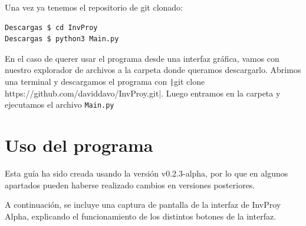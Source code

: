 \documentclass[a4paper, 11pt]{report} %
\begin{document}
\noindent Una vez ya tenemos el repositorio de git clonado:
\begin{verbatim}
Descargas $ cd InvProy
Descargas $ python3 Main.py
\end{verbatim}

En el caso de querer usar el programa desde una interfaz gráfica, vamos con nuestro explorador de archivos a la carpeta donde queramos descargarlo. Abrimos una terminal y descargamos el programa con \texttt|git clone https://github.com/daviddavo/InvProy.git|. Luego entramos en la carpeta y ejecutamos el archivo \texttt{Main.py}
\section{Uso del programa}
Esta guía ha sido creada usando la versión v0.2.3-alpha, por lo que en algunos apartados pueden haberse realizado cambios en versiones posteriores.

A continuación, se incluye una captura de pantalla de la interfaz de InvProy Alpha, explicando el funcionamiento de los distintos botones de la interfaz.
\end{document}
